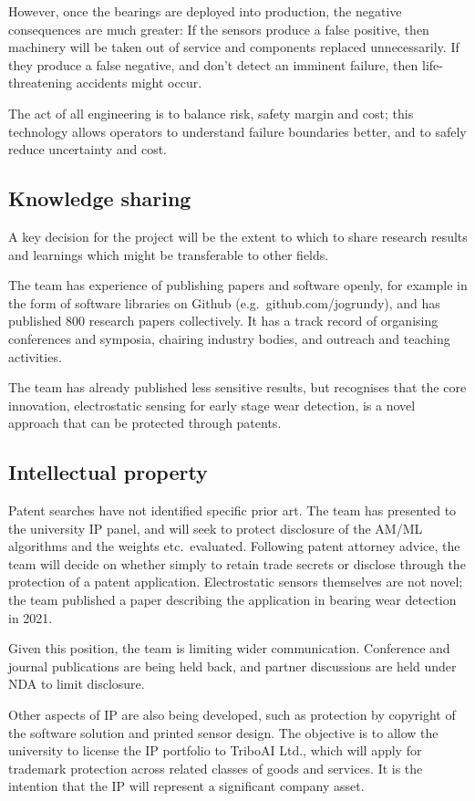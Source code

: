 \documentclass[runningheads]{llncs}
\begin{document}
    However, once the bearings are deployed into production, the negative consequences are much greater: If the sensors produce a false positive, then machinery will be taken out of service and components replaced unnecessarily. If they produce a false negative, and don't detect an imminent failure, then life-threatening accidents might occur. 
    
    The act of all engineering is to balance risk, safety margin and cost; this technology allows operators to understand failure boundaries better, and to safely reduce uncertainty and cost.
\subsection{Knowledge sharing}
    A key decision for the project will be the extent to which to share research results and learnings which might be transferable to other fields. 
    
    The team has experience of publishing papers and software openly, for example in the form of software libraries on Github (e.g.\ github.com/jogrundy), and has published 800 research papers collectively. It has a track record of organising conferences and symposia, chairing industry bodies, and outreach and teaching activities.
    
    The team has already published less sensitive results, but recognises that the core innovation, electrostatic sensing for early stage wear detection, is a novel approach that can be protected through patents. 
\subsection{Intellectual property} 
    Patent searches have not identified specific prior art. The team has presented to the university IP panel, and will seek to protect disclosure of the AM/ML algorithms and the weights etc.\ evaluated. Following patent attorney advice, the team will decide on whether simply to retain trade secrets or disclose through the protection of a patent application. Electrostatic sensors themselves are not novel; the team published a paper describing the application in bearing wear detection in 2021. 
    
    Given this position, the team is limiting wider communication. Conference and journal publications are being held back, and partner discussions are held under NDA to limit disclosure. 

    Other aspects of IP are also being developed, such as protection by copyright of the software solution and printed sensor design. The objective is to allow the university to license the IP portfolio to TriboAI Ltd., which will apply for trademark protection across related classes of goods and services. It is the intention that the IP will represent a significant company asset.
\end{document}
